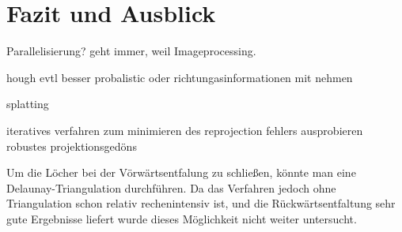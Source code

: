 \chapter{Fazit und Ausblick}
Parallelisierung?
geht immer, weil Imageprocessing.

hough evtl besser probalistic oder richtungasinformationen mit nehmen

splatting

iteratives verfahren zum minimieren des reprojection fehlers ausprobieren
robustes projektionsgedöns

Um die Löcher bei der Vörwärtsentfalung zu schließen, könnte man eine Delaunay-Triangulation durchführen. 
Da das Verfahren jedoch ohne Triangulation schon relativ rechenintensiv ist, und die Rückwärtsentfaltung sehr gute Ergebnisse liefert wurde dieses Möglichkeit nicht weiter untersucht.

